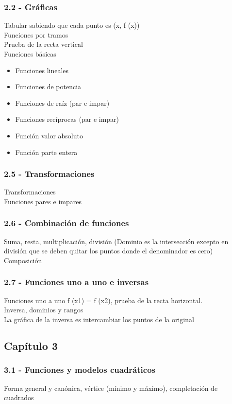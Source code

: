 \subsubsection{2.2 - Gráficas}
Tabular sabiendo que cada punto es (x, f (x))\\
Funciones por tramos\\
Prueba de la recta vertical\\
Funciones básicas
\begin{itemize}
	\item Funciones lineales
	\item Funciones de potencia
	\item Funciones de raíz (par e impar)
	\item Funciones recíprocas (par e impar)
	\item Función valor absoluto
	\item Función parte entera
\end{itemize}
\subsubsection{2.5 - Transformaciones}
Transformaciones\\
Funciones pares e impares
\subsubsection{2.6 - Combinación de funciones}
Suma, resta, multiplicación, división (Dominio es la intersección excepto en división que se deben quitar los puntos donde el denominador es cero)\\
Composición
\subsubsection{2.7 - Funciones uno a uno e inversas}
Funciones uno a uno f (x1) = f (x2), prueba de la recta horizontal.\\
Inversa, dominios y rangos\\
La gráfica de la inversa es intercambiar los puntos de la original
\subsection{Capítulo 3}
\subsubsection{3.1 - Funciones y modelos cuadráticos}
Forma general y canónica, vértice (mínimo y máximo), completación de cuadrados
